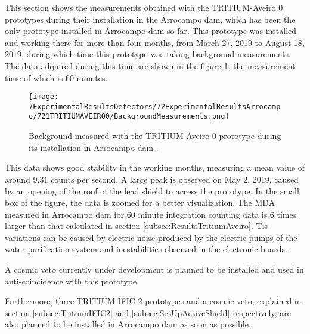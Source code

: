 This section shows the measurements obtained with the TRITIUM-Aveiro 0 prototypes during their installation in the Arrocampo dam, which has been the only prototype installed in Arrocampo dam so far. This prototype was installed and working there for more than four months, from March 27, 2019 to August 18, 2019, during which time this prototype was taking background measurements. The data adquired during this time are shown in the figure \ref{fig:BackgroundArrocampoAveiro}, the measurement time of which is 60 minutes.

\begin{figure}[h]
\centering
\texttt{[image: 7ExperimentalResultsDetectors/72ExperimentalResultsArrocampo/721TRITIUMAVEIRO0/BackgroundMeasurements.png]}
\caption{Background measured with the TRITIUM-Aveiro 0 prototype during its installation in Arrocampo dam \cite{ExperimentalPaperCarlos}.\label{fig:BackgroundArrocampoAveiro}}
\end{figure}

This data shows good stability in the working months, measuring a mean value of around $9.31$ counts per second. A large peak is observed on May 2, 2019, caused by an opening of the roof of the lead shield to access the prototype. In the small box of the figure, the data is zoomed for a better visualization. The MDA measured in Arrocampo dam for 60 minute integration counting data is 6 times larger than that calculated in section \ref{subsec:ResultsTritiumAveiro}. Tis variations can be caused by electric noise produced by the electric pumps of the water purification system and inestabilities observed in the electronic boards.

A cosmic veto currently under development is planned to be installed and used in anti-coincidence with this prototype.

Furthermore, three TRITIUM-IFIC 2 prototypes and a cosmic veto, explained in section \ref{subsec:TritiumIFIC2} and \ref{subsec:SetUpActiveShield} respectively, are also planned to be installed in Arrocampo dam as soon as possible.